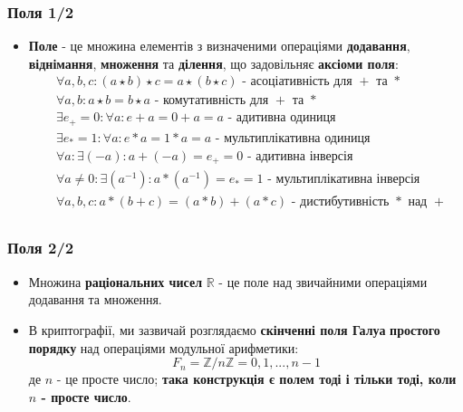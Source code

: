 \documentclass{beamer}
\begin{document}
\begin{frame}
  \frametitle{Поля 1/2}
  \begin{itemize}
  \item \textbf{Поле} - це множина елементів з визначеними операціями \textbf{додавання},
    \textbf{віднімання}, \textbf{множення} та \textbf{ділення}, що задовільняє
    \textbf{аксіоми поля}:
    \begin{align*}
      &\forall a, b, c: (a \star b) \star c = a \star (b \star c) \text{ -
        асоціативність для $+$ та $*$} \\
      &\forall a, b: a \star b = b \star a \text{ - комутативність для $+$ та
        $*$} \\
      &\exists e_+ = 0: \forall a: e + a = 0 + a = a \text{ - адитивна одиниця} \\
      &\exists e_* = 1: \forall a: e * a = 1 * a = a \text{ - мультиплікативна одиниця} \\
      &\forall a: \exists (-a): a + (-a) = e_+ = 0 \text{ - адитивна інверсія} \\
      &\forall a \neq 0: \exists (a^{-1}): a * (a^{-1}) = e_* = 1 \text{ -
        мультиплікативна інверсія} \\
      &\forall a, b, c: a*(b+c) = (a*b) + (a*c) \text{ - дистибутивність $*$ над $+$} \\
    \end{align*}
  \end{itemize}
\end{frame}

\begin{frame}
  \frametitle{Поля 2/2}
  \begin{itemize}
  \item Множина \textbf{раціональних чисел} $\mathbb{R}$ - це поле над звичайними
    операціями додавання та множення.
  \item В криптографії, ми зазвичай розглядаємо \textbf{скінченні поля Галуа}
    \textbf{простого порядку} над операціями модульної арифметики:
    $$F_n = \mathbb{Z}/n\mathbb{Z} = {0, 1, ..., n - 1}$$
    де $n$ - це просте число; \textbf{така конструкція є полем тоді і тільки
      тоді, коли $n$ - просте число}.
  \end{itemize}
\end{frame}
\end{document}
